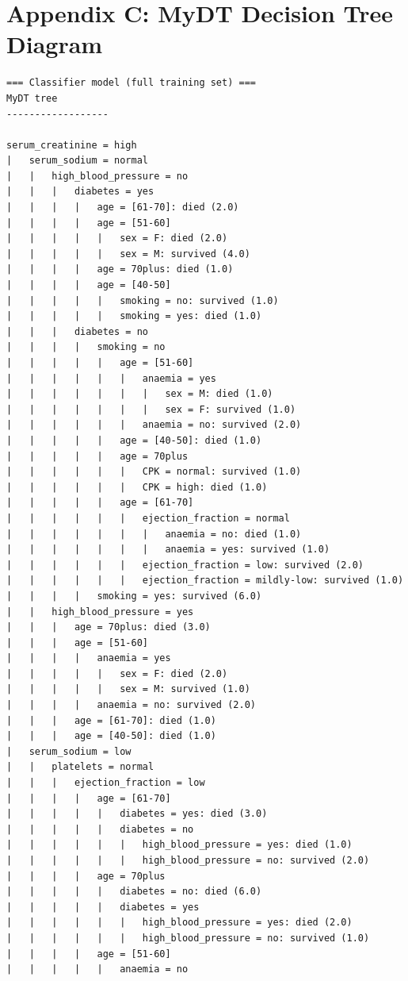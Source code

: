 \documentclass[12pt,a4paper]{article}
\begin{document}
\section*{Appendix C: MyDT Decision Tree Diagram}
{\scriptsize
\begin{verbatim}
=== Classifier model (full training set) ===
MyDT tree
------------------

serum_creatinine = high
|   serum_sodium = normal
|   |   high_blood_pressure = no
|   |   |   diabetes = yes
|   |   |   |   age = [61-70]: died (2.0)
|   |   |   |   age = [51-60]
|   |   |   |   |   sex = F: died (2.0)
|   |   |   |   |   sex = M: survived (4.0)
|   |   |   |   age = 70plus: died (1.0)
|   |   |   |   age = [40-50]
|   |   |   |   |   smoking = no: survived (1.0)
|   |   |   |   |   smoking = yes: died (1.0)
|   |   |   diabetes = no
|   |   |   |   smoking = no
|   |   |   |   |   age = [51-60]
|   |   |   |   |   |   anaemia = yes
|   |   |   |   |   |   |   sex = M: died (1.0)
|   |   |   |   |   |   |   sex = F: survived (1.0)
|   |   |   |   |   |   anaemia = no: survived (2.0)
|   |   |   |   |   age = [40-50]: died (1.0)
|   |   |   |   |   age = 70plus
|   |   |   |   |   |   CPK = normal: survived (1.0)
|   |   |   |   |   |   CPK = high: died (1.0)
|   |   |   |   |   age = [61-70]
|   |   |   |   |   |   ejection_fraction = normal
|   |   |   |   |   |   |   anaemia = no: died (1.0)
|   |   |   |   |   |   |   anaemia = yes: survived (1.0)
|   |   |   |   |   |   ejection_fraction = low: survived (2.0)
|   |   |   |   |   |   ejection_fraction = mildly-low: survived (1.0)
|   |   |   |   smoking = yes: survived (6.0)
|   |   high_blood_pressure = yes
|   |   |   age = 70plus: died (3.0)
|   |   |   age = [51-60]
|   |   |   |   anaemia = yes
|   |   |   |   |   sex = F: died (2.0)
|   |   |   |   |   sex = M: survived (1.0)
|   |   |   |   anaemia = no: survived (2.0)
|   |   |   age = [61-70]: died (1.0)
|   |   |   age = [40-50]: died (1.0)
|   serum_sodium = low
|   |   platelets = normal
|   |   |   ejection_fraction = low
|   |   |   |   age = [61-70]
|   |   |   |   |   diabetes = yes: died (3.0)
|   |   |   |   |   diabetes = no
|   |   |   |   |   |   high_blood_pressure = yes: died (1.0)
|   |   |   |   |   |   high_blood_pressure = no: survived (2.0)
|   |   |   |   age = 70plus
|   |   |   |   |   diabetes = no: died (6.0)
|   |   |   |   |   diabetes = yes
|   |   |   |   |   |   high_blood_pressure = yes: died (2.0)
|   |   |   |   |   |   high_blood_pressure = no: survived (1.0)
|   |   |   |   age = [51-60]
|   |   |   |   |   anaemia = no

\end{verbatim}}
\end{document}

